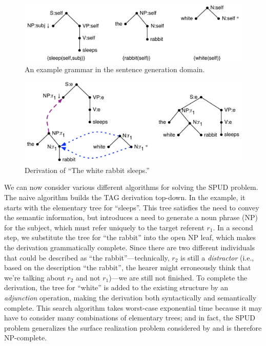 \begin{figure}[t]
  \centering
  \includegraphics[width=0.75\columnwidth]{pic-grammar}
  \caption{An example grammar in the sentence generation domain.}
  \label{fig:white-rabbit-sleeps-grammar}
\end{figure}

\begin{figure}[t]
  \centering
  \includegraphics[width=0.75\columnwidth]{pic-derivation}
  \caption{Derivation of ``The white rabbit sleeps.''}
  \label{fig:white-rabbit-sleeps-deriv}
\end{figure}

We can now consider various different algorithms for solving the SPUD
problem. The naive algorithm builds the TAG derivation top-down. In
the example, it starts with the elementary tree for ``sleeps''. This
tree satisfies the need to convey the semantic information, but
introduces a need to generate a noun phrase (NP) for the subject,
which must refer uniquely to the target referent $r_1$. In a second
step, we substitute the tree for ``the rabbit'' into the open NP leaf,
which makes the derivation grammatically complete. Since there are two
different individuals that could be described as ``the
rabbit''---technically, $r_2$ is still a \emph{distractor} (i.e.,
based on the description ``the rabbit'', the hearer might erroneously
think that we're talking about $r_2$ and not $r_1$)---we are still not
finished. To complete the derivation, the tree for ``white'' is added
to the existing structure by an \emph{adjunction} operation, making
the derivation both syntactically and semantically complete. This
search algorithm takes worst-case exponential time because it may have
to consider many combinations of elementary trees; and in fact, the
SPUD problem generalizes the surface realization problem considered by
\citet{KolStr02} and is therefore NP-complete.


